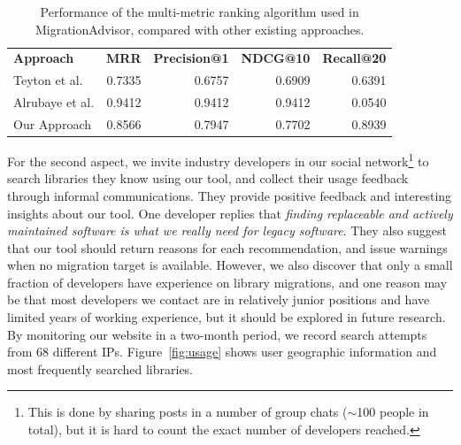 \documentclass[conference,10pt]{IEEEtran}
\begin{document}
\begin{table}[t]
\caption{Performance of the multi-metric ranking algorithm used in MigrationAdvisor, compared with other existing approaches.}
\centering
\begin{tabular}{|l|r|r|r|r|}
\hline
\textbf{Approach} & \textbf{MRR} & \textbf{Precision@1} & \textbf{NDCG@10} & \textbf{Recall@20}  \\ 
\hhline{|=|=|=|=|=|}
Teyton et al.             & 0.7335 & 0.6757 & 0.6909 & 0.6391 \\ \hline
Alrubaye et al.           & 0.9412 & 0.9412 & 0.9412 & 0.0540 \\ \hline
Our Approach              & 0.8566 & 0.7947 & 0.7702 & 0.8939 \\ \hline
\end{tabular}
\label{tab:perf-comp}
\end{table}

For the second aspect, we invite industry developers in our social network\footnote{This is done by sharing posts in a number of group chats ($\sim$100 people in total), but it is hard to count the exact number of developers reached.} to search libraries they know using our tool, and collect their usage feedback through informal communications. 
They provide positive feedback and interesting insights about our tool.
One developer replies that \textit{finding replaceable and actively maintained software is what we really need for legacy software}.
They also suggest that our tool should return reasons for each recommendation, and issue warnings when no migration target is available.
However, we also discover that only a small fraction of developers have experience on library migrations, and one reason may be that most developers we contact are in relatively junior positions and have limited years of working experience, but it should be explored in future research.
By monitoring our website in a two-month period, we record search attempts from 68 different IPs. Figure~\ref{fig:usage} shows user geographic information and most frequently searched libraries.
\end{document}
